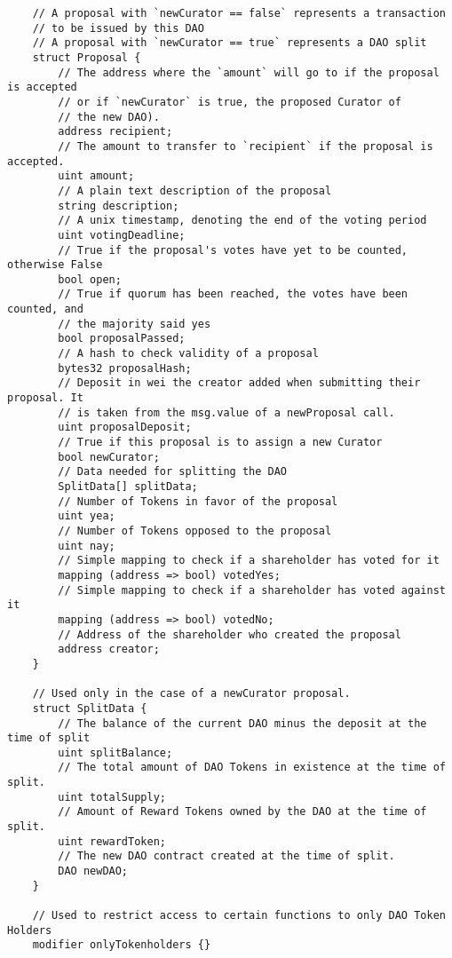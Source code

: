 \documentclass[9pt,oneside]{amsart}
\begin{document}
\begin{appendix}
\begin{verbatim}
    // A proposal with `newCurator == false` represents a transaction
    // to be issued by this DAO
    // A proposal with `newCurator == true` represents a DAO split
    struct Proposal {
        // The address where the `amount` will go to if the proposal is accepted
        // or if `newCurator` is true, the proposed Curator of
        // the new DAO).
        address recipient;
        // The amount to transfer to `recipient` if the proposal is accepted.
        uint amount;
        // A plain text description of the proposal
        string description;
        // A unix timestamp, denoting the end of the voting period
        uint votingDeadline;
        // True if the proposal's votes have yet to be counted, otherwise False
        bool open;
        // True if quorum has been reached, the votes have been counted, and
        // the majority said yes
        bool proposalPassed;
        // A hash to check validity of a proposal
        bytes32 proposalHash;
        // Deposit in wei the creator added when submitting their proposal. It
        // is taken from the msg.value of a newProposal call.
        uint proposalDeposit;
        // True if this proposal is to assign a new Curator
        bool newCurator;
        // Data needed for splitting the DAO
        SplitData[] splitData;
        // Number of Tokens in favor of the proposal
        uint yea;
        // Number of Tokens opposed to the proposal
        uint nay;
        // Simple mapping to check if a shareholder has voted for it
        mapping (address => bool) votedYes;
        // Simple mapping to check if a shareholder has voted against it
        mapping (address => bool) votedNo;
        // Address of the shareholder who created the proposal
        address creator;
    }

    // Used only in the case of a newCurator proposal.
    struct SplitData {
        // The balance of the current DAO minus the deposit at the time of split
        uint splitBalance;
        // The total amount of DAO Tokens in existence at the time of split.
        uint totalSupply;
        // Amount of Reward Tokens owned by the DAO at the time of split.
        uint rewardToken;
        // The new DAO contract created at the time of split.
        DAO newDAO;
    }

    // Used to restrict access to certain functions to only DAO Token Holders
    modifier onlyTokenholders {}


\end{verbatim}
\end{appendix}
\end{document}
